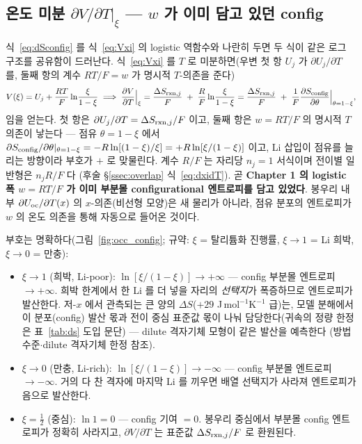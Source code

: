 \subsection{온도 미분 $\partial V/\partial T|_\xi$ --- $w$ 가 이미 담고 있던 config}\label{ssec:dvdt}
식~\eqref{eq:dSconfig} 를 식~\eqref{eq:Vxi} 의 logistic 역함수와 나란히 두면 두 식이 같은 로그 구조를 공유함이
드러난다. 식~\eqref{eq:Vxi} 를 $T$ 로 미분하면(우변 첫 항 $U_j$ 가 $\partial U_j/\partial T$ 를, 둘째 항의
계수 $RT/F=w$ 가 명시적 $T$-의존을 준다)
\begin{equation}
V(\xi)=U_j+\frac{RT}{F}\ln\!\frac{\xi}{1-\xi}
\;\Longrightarrow\;
\frac{\partial V}{\partial T}\Big|_\xi
= \frac{\Delta S_{\mathrm{rxn},j}}{F}\;+\;\frac{R}{F}\ln\!\frac{\xi}{1-\xi}
= \frac{\Delta S_{\mathrm{rxn},j}}{F}\;+\;\frac{1}{F}\frac{\partial S_{\mathrm{config}}}{\partial\theta}\Big|_{\theta=1-\xi},
\label{eq:dVdT_config}
\end{equation}
임을 얻는다. 첫 항은 $\partial U_j/\partial T=\Delta S_{\mathrm{rxn},j}/F$ 이고, 둘째 항은 $w=RT/F$ 의 명시적 $T$
의존이 낳는다 --- 점유 $\theta=1-\xi$ 에서
$\partial S_{\mathrm{config}}/\partial\theta|_{\theta=1-\xi}=-R\ln[(1-\xi)/\xi]=+R\ln[\xi/(1-\xi)]$ 이고, Li 삽입이 점유를
늘리는 방향이라 부호가 $+$ 로 맞물린다. 계수 $R/F$ 는 자리당 $n_j{=}1$ 서식이며 전이별 일반형은 $n_jR/F$ 다
(후술 \S\ref{ssec:overlap} 식~\eqref{eq:dxidT}). 곧 \textbf{Chapter 1 의 logistic 폭 $w=RT/F$ 가 이미 부분몰
configurational 엔트로피를 담고 있었다}. 봉우리 내부 $\partial U_{\mathrm{oc}}/\partial T(x)$ 의 $x$-의존(비선형 모양)은
새 물리가 아니라, 점유 분포의 엔트로피가 $w$ 의 온도 의존을 통해 자동으로 들어온 것이다.

부호는 명확하다(그림~\ref{fig:occ_config}; 규약: $\xi$ = 탈리튬화 진행률, $\xi\to1$ = Li 희박, $\xi\to0$ = 만충):
\begin{itemize}[leftmargin=1.4em,itemsep=1pt]
\item $\xi\to1$ (희박, Li-poor): $\ln[\xi/(1-\xi)]\to+\infty$ --- config 부분몰 엔트로피 $\to+\infty$. 희박
한계에서 한 Li 를 더 넣을 자리의 \emph{선택지}가 폭증하므로 엔트로피가 발산한다. 저-$x$ 에서 관측되는 큰 양의
$\Delta S$($+29$ J\,mol$^{-1}$K$^{-1}$ 급)는, 모델 분해에서 이 분포(config) 발산 몫과 전이 중심 표준값 몫이
나눠 담당한다(귀속의 정량 한정은 표~\ref{tab:ds} 도입 문단) --- dilute 격자기체 모형이 같은 발산을 예측한다
\cite{occupation2019}(방법 수준$\cdot$dilute 격자기체 한정 참조).
\item $\xi\to0$ (만충, Li-rich): $\ln[\xi/(1-\xi)]\to-\infty$ --- config 부분몰 엔트로피 $\to-\infty$. 거의 다 찬
격자에 마지막 Li 를 끼우면 배열 선택지가 사라져 엔트로피가 음으로 발산한다.
\item $\xi=\tfrac12$ (중심): $\ln 1=0$ --- config 기여 $=0$. 봉우리 중심에서 부분몰 config 엔트로피가 정확히
사라지고, $\partial V/\partial T$ 는 표준값 $\Delta S_{\mathrm{rxn},j}/F$ 로 환원된다.
\end{itemize}


